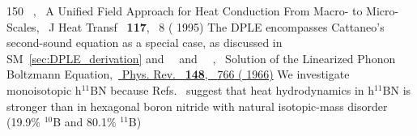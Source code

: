 \documentclass[
prb,
twocolumn,
superscriptaddress,
 amsmath,amssymb,
 aps,
longbibliography,
]{revtex4-2}
\begin{document}
\begin{thebibliography}{150}
  \BibitemOpen
   { {\ },\ } { {A {Unified} {Field} {Approach} for {Heat} {Conduction} {From} {Macro}- to {Micro}-{Scales}},\ }\href@noop {} { { {J Heat Transf}\ }\textbf { {117}},\  {8} ( {1995})}
  \BibitemOpen
   {The DPLE encompasses Cattaneo's second-sound equation \cite {cattaneo1958form} as a special case, as discussed in SM~\ref {sec:DPLE_derivation} and \cite {tzou_unified_1995}}
  \BibitemOpen
   { {\ }\ and\  {\ },\ } { {Solution of the {Linearized} {Phonon} {Boltzmann} {Equation}},\ }\href {https://link.aps.org/doi/10.1103/PhysRev.148.766} { { {Phys. Rev.}\ }\textbf { {148}},\  {766} ( {1966})}
  \BibitemOpen
   {We investigate monoisotopic h$^{11}$BN because Refs.~\cite {yuan_modulating_2019,SimoncelliPhD} suggest that heat hydrodynamics in h$^{11}$BN is stronger than in hexagonal boron nitride with natural isotopic-mass disorder (19.9\% $^{10}$B and 80.1\% $^{11}$B)}
  \BibitemOpen

\end{thebibliography}
\end{document}
